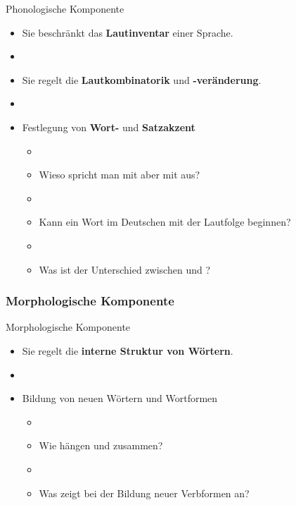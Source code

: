 \begin{frame}{Phonologische Komponente}

	\begin{itemize}
		\item Sie beschränkt das \textbf{Lautinventar} einer Sprache.
		\item[]
		\item Sie regelt die \textbf{Lautkombinatorik} und \textbf{-veränderung}.
		\item[]
		\item Festlegung von \textbf{Wort-} und \textbf{Satzakzent}

		\begin{itemize}
			\item[]
			\item<2->[$\rightarrow$] Wieso spricht man  mit \textipa{[t]} aber  mit \textipa{[d]} aus?
			\item[]
			\item<3->[$\rightarrow$] Kann ein Wort im Deutschen mit der Lautfolge \textipa{[Ng]} beginnen?
			\item[]
			\item<4->[$\rightarrow$] Was ist der Unterschied zwischen  und ?
		\end{itemize}		  
	
	\end{itemize}
	
\end{frame}


\subsubsection{Morphologische Komponente}

\begin{frame}{Morphologische Komponente}

\begin{itemize}
	\item Sie regelt die \textbf{interne Struktur von Wörtern}.
	\item[]
	\item Bildung von neuen Wörtern und Wortformen
				
	\begin{itemize}
		\item[]
		\item<2->[$\rightarrow$] Wie hängen  und  zusammen?
		\item[]
		\item<3->[$\rightarrow$] Was zeigt  bei der Bildung neuer Verbformen an?
	\end{itemize}
			
\end{itemize}

\end{frame}


